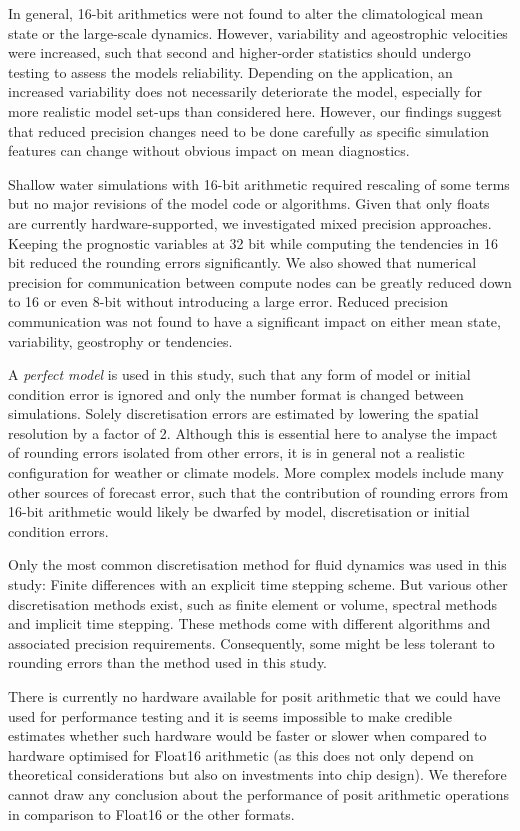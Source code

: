In general, 16-bit arithmetics were not found to alter the climatological mean
state or the large-scale dynamics. However, variability and ageostrophic velocities
were increased, such that second and higher-order statistics should undergo
testing to assess the models reliability. Depending on the application, an increased
variability does not necessarily deteriorate the model, especially for more
realistic model set-ups than considered here. However, our findings suggest that
reduced precision changes need to be done carefully as specific simulation features
can change without obvious impact on mean diagnostics.

Shallow water simulations with 16-bit arithmetic required rescaling of some terms
but no major revisions of the model code or algorithms. Given that only floats are
currently hardware-supported, we investigated mixed precision approaches.
Keeping the prognostic variables at 32 bit while computing the tendencies in 16 bit
reduced the rounding errors significantly. We also showed that numerical precision
for communication between compute nodes can be greatly reduced down to 16 or
even 8-bit without introducing a large error. Reduced precision communication was
not found to have a significant impact on either mean state, variability,
geostrophy or tendencies.

A \emph{perfect model} is used in this study, such that any form
of model or initial condition error is ignored and only the number format is
changed between simulations. Solely discretisation errors are estimated by
lowering the spatial resolution by a factor of 2. Although this is essential
here to analyse the impact of rounding errors isolated from other errors, it
is in general not a realistic configuration for weather or climate models. More
complex models include many other sources of forecast error, such that the
contribution of rounding errors from 16-bit arithmetic would likely be dwarfed by
model, discretisation or initial condition errors.

Only the most common discretisation method for fluid dynamics was used in
this study: Finite differences with an explicit time stepping scheme. But various
other discretisation methods exist, such as finite element or volume, spectral
methods and implicit time stepping. These methods come with different algorithms
and associated precision requirements. Consequently, some might be
less tolerant to rounding errors than the method used in this study.

There is currently no hardware available for posit arithmetic that we could have used
for performance testing and it is seems impossible to make credible estimates
whether such hardware would be faster or slower when compared to hardware
optimised for Float16 arithmetic (as this does not only depend on theoretical
considerations but also on investments into chip design). We therefore cannot
draw any conclusion about the performance of posit arithmetic operations in
comparison to Float16 or the other formats.

